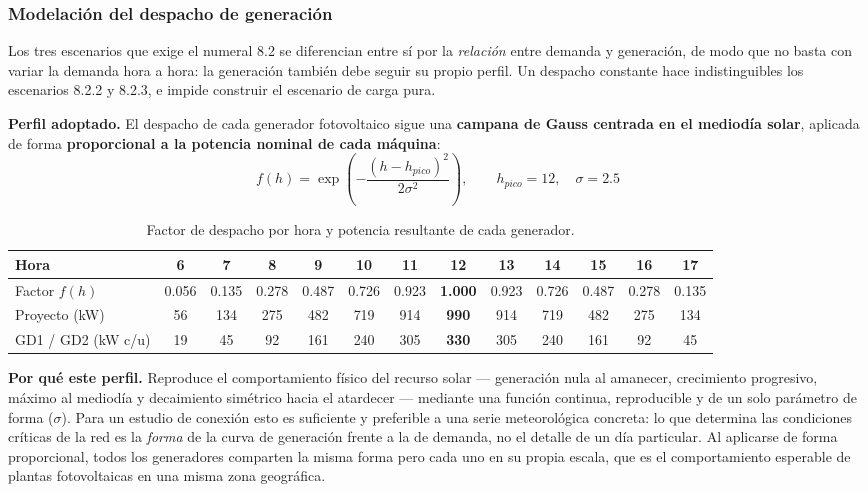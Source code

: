 \documentclass[11pt,a4paper]{article}
\begin{document}
\subsubsection*{Modelaci\'on del despacho de generaci\'on}
\label{sec:despacho}

Los tres escenarios que exige el numeral 8.2 se diferencian entre s\'i por la
\emph{relaci\'on} entre demanda y generaci\'on, de modo que no basta con variar la
demanda hora a hora: la generaci\'on tambi\'en debe seguir su propio perfil. Un
despacho constante hace indistinguibles los escenarios 8.2.2 y 8.2.3, e impide
construir el escenario de carga pura.

\textbf{Perfil adoptado.} El despacho de cada generador fotovoltaico sigue una
\textbf{campana de Gauss centrada en el mediod\'ia solar}, aplicada de forma
\textbf{proporcional a la potencia nominal de cada m\'aquina}:
\[
f(h) = \exp\!\left(-\frac{(h - h_{pico})^2}{2\sigma^2}\right), \qquad h_{pico} = 12,\quad \sigma = 2.5
\]

\begin{table}[H]
\centering
\caption{Factor de despacho por hora y potencia resultante de cada generador.}
\begin{tabular}{lcccccccccccc}
\toprule
Hora & 6 & 7 & 8 & 9 & 10 & 11 & 12 & 13 & 14 & 15 & 16 & 17 \\
\midrule
Factor $f(h)$ & 0.056 & 0.135 & 0.278 & 0.487 & 0.726 & 0.923 & \textbf{1.000} & 0.923 & 0.726 & 0.487 & 0.278 & 0.135 \\
Proyecto (kW) & 56 & 134 & 275 & 482 & 719 & 914 & \textbf{990} & 914 & 719 & 482 & 275 & 134 \\
GD1 / GD2 (kW c/u) & 19 & 45 & 92 & 161 & 240 & 305 & \textbf{330} & 305 & 240 & 161 & 92 & 45 \\
\bottomrule
\end{tabular}
\end{table}

\textbf{Por qu\'e este perfil.} Reproduce el comportamiento f\'isico del recurso
solar --- generaci\'on nula al amanecer, crecimiento progresivo, m\'aximo al
mediod\'ia y decaimiento sim\'etrico hacia el atardecer --- mediante una funci\'on
continua, reproducible y de un solo par\'ametro de forma ($\sigma$). Para un
estudio de conexi\'on esto es suficiente y preferible a una serie meteorol\'ogica
concreta: lo que determina las condiciones cr\'iticas de la red es la \emph{forma}
de la curva de generaci\'on frente a la de demanda, no el detalle de un d\'ia
particular. Al aplicarse de forma proporcional, todos los generadores comparten la
misma forma pero cada uno en su propia escala, que es el comportamiento esperable
de plantas fotovoltaicas en una misma zona geogr\'afica.
\end{document}

